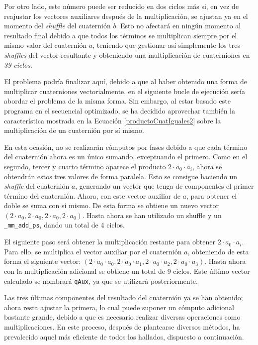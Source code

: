 \documentclass[conference]{IEEEtran}
\begin{document}
Por otro lado, este número puede ser reducido en dos ciclos más si, en vez de reajustar los vectores auxiliares después de la multiplicación, se ajustan ya en el momento del \textit{shuffle} del cuaternión $b$. Esto no afectará en ningún momento al resultado final debido a que todos los términos se multiplican siempre por el mismo valor del cuaternión $a$, teniendo que gestionar así simplemente los tres \textit{shuffles} del vector resultante y obteniendo una multiplicación de cuaterniones en \textit{39 ciclos}.

El problema podría finalizar aquí, debido a que al haber obtenido una forma de multiplicar cuaterniones vectorialmente, en el siguiente bucle de ejecución sería abordar el problema de la misma forma. Sin embargo, al estar basado este programa en el secuencial optimizado, se ha decidido aprovechar también la característica mostrada en la Ecuación \ref{productoCuatIguales2} sobre la multiplicación de un cuaternión por sí mismo.

En esta ocasión, no se realizarán cómputos por fases debido a que cada término del cuaternión ahora es un único sumando, exceptuando el primero. Como en el segundo, tercer y cuarto término aparece el producto $2\cdot a_{0}\cdot a_{i}$, ahora se obtendrán estos tres valores de forma paralela. Esto se consigue haciendo un \textit{shuffle} del cuaternión $a$, generando un vector que tenga de componentes el primer término del cuaternión. Ahora, con este vector auxiliar de $a$, para obtener el doble se suma con sí mismo. De esta forma se obtiene un nuevo vector $(2\cdot a_{0}, 2\cdot a_{0}, 2\cdot a_{0}, 2\cdot a_{0})$. Hasta ahora se han utilizado un shuffle y un \texttt{\_mm\_add\_ps}, dando un total de 4 ciclos.

El siguiente paso será obtener la multiplicación restante para obtener $2\cdot a_{0}\cdot a_{i}$. Para ello, se multiplica el vector auxiliar por el cuaternión $a$, obteniendo de esta forma el siguiente vector: $(2\cdot a_{0}\cdot a_{0}, 2\cdot a_{0}\cdot a_{1}, 2\cdot a_{0}\cdot a_{2}, 2\cdot a_{0}\cdot a_{3})$. Hasta ahora con la multiplicación adicional se obtiene un total de 9 ciclos. Este último vector calculado se nombrará \texttt{qAux}, ya que se utilizará posteriormente.

Las tres últimas componentes del resultado del cuaternión ya se han obtenido; ahora resta ajustar la primera, lo cual puede suponer un cómputo adicional bastante grande, debido a que es necesario realizar diversas operaciones como multiplicaciones. En este proceso, después de plantearse diversos métodos, ha prevalecido aquel más eficiente de todos los hallados, dispuesto a continuación.
\end{document}
